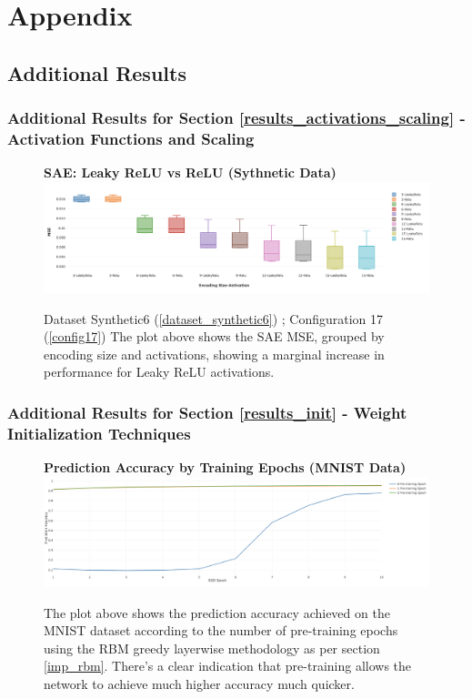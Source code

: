 \documentclass[a4paper,11pt,oneside]{article}
\theoremstyle{plain}
\theoremstyle{definition}
\begin{document}
\newpage
\section{Appendix}\label{Appendix}

\subsection{Additional Results}

\subsubsection{Additional Results for Section \ref{results_activations_scaling} - Activation Functions and Scaling }\label{results_activations_appendix}

\begin{figure}[H]
	\centering 
	\textbf{SAE: Leaky ReLU vs ReLU (Sythnetic Data)} 
	\includegraphics[scale=0.28]{images/results/activations/synthetic_mse_leakyrelu.png}
	\caption[SAE: Leaky ReLU vs ReLU (Sythnetic Data)]{Dataset Synthetic6  (\ref{dataset_synthetic6}) ; Configuration 17 (\ref{config17})
		\newline The plot above shows the SAE MSE, grouped by encoding size and activations, showing a marginal increase in performance for Leaky ReLU activations. }
	\label{figure-synthetic_mse_leakyrelu}
\end{figure}

\subsubsection{Additional Results for Section \ref{results_init} - Weight Initialization Techniques }\label{results_init_appendix}

\begin{figure}[H]
	\centering 
	\textbf{Prediction Accuracy by Training Epochs (MNIST Data)} 
	\includegraphics[scale=0.2]{images/results/newinit/rbm_pretraining.png}
	\caption[Prediction Accuracy by Training Epochs (MNIST Data)]{The plot above shows the prediction accuracy achieved on the MNIST dataset according to the number of pre-training epochs using the RBM greedy layerwise methodology as per section \ref{imp_rbm}. There's a clear indication that pre-training allows the network to achieve much higher accuracy much quicker.}
	\label{figure-rbm_pretraining}
\end{figure}
\end{document}
